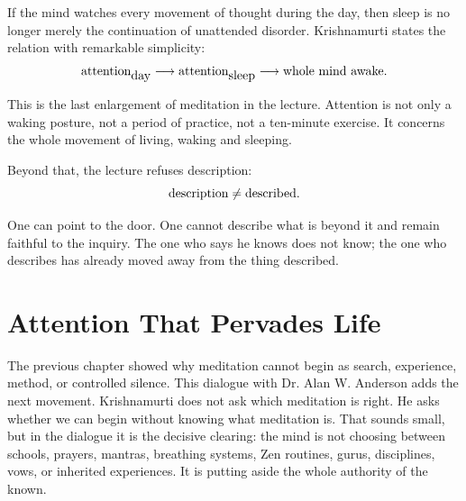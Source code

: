 \documentclass[11pt,oneside]{book}
\begin{document}
If the mind watches every movement of thought during the day, then sleep is no longer merely the continuation of unattended disorder. Krishnamurti states the relation with remarkable simplicity:
\begin{equation}
\hbox{attention}_{\hbox{day}}
\longrightarrow
\hbox{attention}_{\hbox{sleep}}
\longrightarrow
\hbox{whole mind awake}.
\end{equation}

This is the last enlargement of meditation in the lecture. Attention is not only a waking posture, not a period of practice, not a ten-minute exercise. It concerns the whole movement of living, waking and sleeping.

Beyond that, the lecture refuses description:
\begin{equation}
\hbox{description}\neq\hbox{described}.
\end{equation}

One can point to the door. One cannot describe what is beyond it and remain faithful to the inquiry. The one who says he knows does not know; the one who describes has already moved away from the thing described.


\chapter{Attention That Pervades Life}

The previous chapter showed why meditation cannot begin as search, experience, method, or controlled silence. This dialogue with Dr. Alan W. Anderson adds the next movement. Krishnamurti does not ask which meditation is right. He asks whether we can begin without knowing what meditation is. That sounds small, but in the dialogue it is the decisive clearing: the mind is not choosing between schools, prayers, mantras, breathing systems, Zen routines, gurus, disciplines, vows, or inherited experiences. It is putting aside the whole authority of the known.
\end{document}
